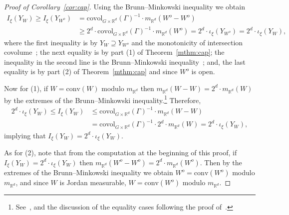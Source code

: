 \documentclass{amsart}
\numberwithin{equation}{subsection}
\theoremstyle{remark}
\begin{document}
\begin{proof}[Proof of Corollary~\ref{cor:cap}]
Using the Brunn--Minkowski inequality we obtain
\begin{align*}
I_{\xi}\left(Y_{W}\right)\geq I_{\xi}\left(Y_{W^{o}}\right)
&=\mathrm{covol}_{G\times \mathbb{R}^{d}}\left(\Gamma\right)^{-1}\cdot m_{\mathbb{R}^{d}}\left(W^{o}-W^{o}\right)\\
&\geq 2^{d}\cdot\mathrm{covol}_{G\times \mathbb{R}^{d}}\left(\Gamma\right)^{-1}\cdot m_{\mathbb{R}^{d}}\left(W^{o}\right)=2^{d}\cdot\iota_{\xi}\left(Y_{W^{o}}\right)=2^{d}\cdot\iota_{\xi}\left(Y_{W}\right), 
\end{align*}
where the first inequality is by \(Y_{W}\supseteq Y_{W^{o}}\) and the monotonicity of intersection covolume~\cite[Proposition 7.1]{AvBjCuI}; the next equality is by part (1) of Theorem~\ref{mthm:cap}; the inequality in the second line is the Brunn--Minkowski inequality~\cite[\S4]{gardner2002brunn}; and, the last equality is by part (2) of Theorem~\ref{mthm:cap} and since \(W^{o}\) is open.

Now for (1), if \(W=\mathrm{conv}\left(W\right)\) modulo \(m_{\mathbb{R}^{d}}\) then \(m_{\mathbb{R}^{d}}\left(W-W\right)=2^{d}\cdot m_{\mathbb{R}^{d}}\left(W\right)\) by the extremes of the Brunn--Minkowski inequality.\footnote{See~\cite[\S4]{gardner2002brunn}, and the discussion of the equality cases following the proof of~\cite[Theorem 4.1]{gardner2002brunn}.} Therefore,
\begin{align*}
2^{d}\cdot\iota_{\xi}\left(Y_{W}\right)\leq I_{\xi}\left(Y_{W}\right)
&\leq\mathrm{covol}_{G\times\mathbb{R}^{d}}\left(\Gamma\right)^{-1}\cdot m_{\mathbb{R}^{d}}\left(W-W\right)\\
&=\mathrm{covol}_{G\times\mathbb{R}^{d}}\left(\Gamma\right)^{-1}\cdot2^{d}\cdot m_{\mathbb{R}^{d}}\left(W\right)=2^{d}\cdot\iota_{\xi}\left(Y_{W}\right),
\end{align*}
implying that \(I_{\xi}\left(Y_{W}\right)=2^{d}\cdot\iota_{\xi}\left(Y_{W}\right)\).

As for (2), note that from the computation at the beginning of this proof, if \(I_{\xi}\left(Y_{W}\right)=2^{d}\cdot\iota_{\xi}\left(Y_{W}\right)\) then \(m_{\mathbb{R}^{d}}\left(W^{o}-W^{o}\right)=2^{d}\cdot m_{\mathbb{R}^{d}}\left(W^{o}\right)\). Then by the extremes of the Brunn--Minkowski inequality we obtain \(W^{o}=\mathrm{conv}\left(W^{o}\right)\) modulo \(m_{\mathbb{R}^{d}}\), and since \(W\) is Jordan measurable, \(W=\mathrm{conv}\left(W^{o}\right)\) modulo \(m_{\mathbb{R}^{d}}\).
\end{proof}
\end{document}
